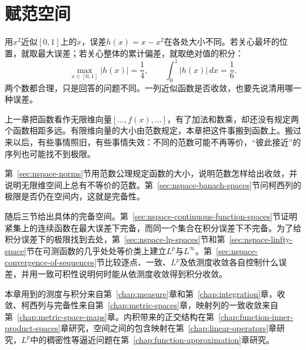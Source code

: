 \chapter{赋范空间}
\label{chap:function-normed-spaces}
\label{chap:functional-analysis-and-approximation}

用$x^2$近似$[0,1]$上的$x$，误差$h(x)=x-x^2$在各处大小不同。若关心最坏的位置，就取最大误差；若关心整体的累计偏差，就取绝对值的积分：
\[
 \max_{x\in[0,1]}\lvert h(x)\rvert=\frac14,\qquad \int_0^1\lvert h(x)\rvert\,dx=\frac16.
\]
两个数都合理，只是回答的问题不同。一列近似函数是否收敛，也要先说清用哪一种误差。

上一章把函数看作无限维向量$[\ldots,f(x),\ldots]$，有了加法和数乘，却还没有规定两个函数相距多远。有限维向量的大小由范数规定，本章把这件事搬到函数上。搬过来以后，有些事情照旧，有些事情失效：不同的范数可能不再等价，“彼此接近”的序列也可能找不到极限。

第~\ref{sec:nspace-norms}节用范数公理规定函数的大小，说明范数怎样给出收敛，并说明无限维空间上总有不等价的范数。第~\ref{sec:nspace-banach-spaces}节问柯西列的极限是否仍在空间内，这就是完备性。

随后三节给出具体的完备空间。第~\ref{sec:nspace-continuous-function-spaces}节证明紧集上的连续函数在最大误差下完备，而同一个集合在积分误差下不完备。为了给积分误差下的极限找到去处，第~\ref{sec:nspace-lp-spaces}节和第~\ref{sec:nspace-linfty-space}节在可测函数的几乎处处等价类上建立$L^p$与$L^\infty$。第~\ref{sec:nspace-convergence-of-sequences}节比较逐点、一致、$L^p$及依测度收敛各自控制什么误差，并用一致可积性说明何时能从依测度收敛得到积分收敛。

本章用到的测度与积分来自第~\ref{chap:measure}章和第~\ref{chap:integration}章，收敛、柯西列与完备性来自第~\ref{chap:metric-spaces}章，映射列的一致收敛来自第~\ref{chap:metric-space-maps}章。内积带来的正交结构在第~\ref{chap:function-inner-product-spaces}章研究，空间之间的包含映射在第~\ref{chap:linear-operators}章研究，$L^p$中的稠密性等逼近问题在第~\ref{chap:function-approximation}章研究。








